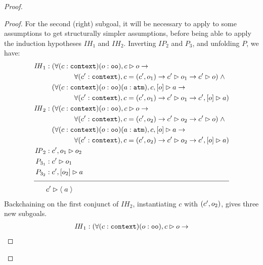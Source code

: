 \begin{proof}
\begin{proof}
For the second (right) subgoal, it will be necessary to apply  to some assumptions to get structurally simpler assumptions, before being able to apply the induction hypotheses $\mathit{IH}_1$ and $\mathit{IH}_2$.
Inverting $\mathit{IP}_2$ and $P_3$, and unfolding $P$, we have:
\begin{align*}
\mathit{IH}_1 &: (\forall (c : \sltm{context}) (o : \sltm{oo}), \seqsl[c]{o} \rightarrow \\
& \qquad\qquad \forall (\inddyncon{} : \sltm{context}), c = (\inddyncon{}, o_1) \rightarrow \seqsl[\inddyncon{}]{o_1} \rightarrow \seqsl[\inddyncon{}]{o}) \; \wedge \\
& \;\;\; (\forall (c : \sltm{context}) (o : \sltm{oo}) (a : \sltm{atm}), \bchsl[c]{o}{a} \rightarrow \\
& \qquad\qquad \forall (\inddyncon{} : \sltm{context}), c = (\inddyncon{}, o_1) \rightarrow \seqsl[\inddyncon{}]{o_1} \rightarrow \bchsl[\inddyncon{}]{o}{a}) \\
\mathit{IH}_2 &: (\forall (c : \sltm{context}) (o : \sltm{oo}), \seqsl[c]{o} \rightarrow \\
& \qquad\qquad \forall (\inddyncon{} : \sltm{context}), c = (\inddyncon{}, o_2) \rightarrow \seqsl[\inddyncon{}]{o_2} \rightarrow \seqsl[\inddyncon{}]{o}) \; \wedge \\
& \;\;\; (\forall (c : \sltm{context}) (o : \sltm{oo}) (a : \sltm{atm}), \bchsl[c]{o}{a} \rightarrow \\
& \qquad\qquad \forall (\inddyncon{} : \sltm{context}), c = (\inddyncon{}, o_2) \rightarrow \seqsl[\inddyncon{}]{o_2} \rightarrow \bchsl[\inddyncon{}]{o}{a}) \\
\mathit{IP}_2 &: \seqsl[\inddyncon{} , o_1]{o_2} \\
P_{3_1} &: \seqsl[\inddyncon{}]{o_1} \\
P_{3_2} &: \bchsl[\inddyncon{}]{o_2}{a} \\[\pfshift{}]
\cline{1-2}
& \seqsl[\inddyncon{}]{\atom{a}}
\end{align*}
Backchaining on the first conjunct of $\mathit{IH}_2$, instantiating $c$ with $(c'{} , o_2)$, gives three new subgoals.
\begin{align*}
\mathit{IH}_1 &: (\forall (c : \sltm{context}) (o : \sltm{oo}), \seqsl[c]{o} \rightarrow \\

\end{align*}
\end{proof}
\end{proof}
